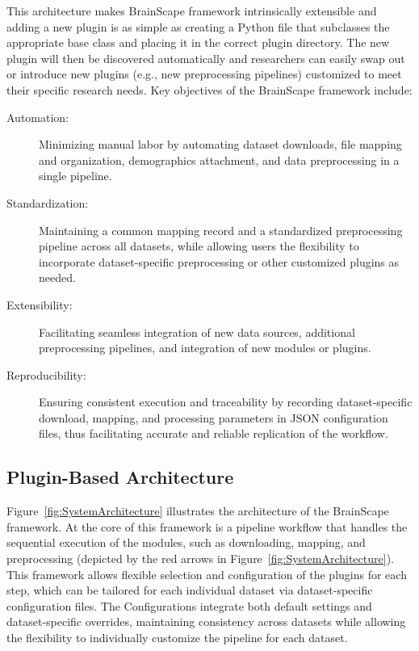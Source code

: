 This architecture makes BrainScape framework intrinsically extensible and adding a new plugin
is as simple as creating a Python file that subclasses the appropriate base class 
and placing it in the correct plugin directory. 
The new plugin will then be discovered automatically and 
researchers can easily swap out or introduce new plugins (e.g., new preprocessing pipelines) 
customized to meet their specific research needs.
Key objectives of the BrainScape framework include: 
\begin{description}
    \item[Automation:] Minimizing manual labor by automating dataset downloads, file mapping and organization, demographics attachment, and data preprocessing in a single pipeline.
    \item[Standardization:] Maintaining a common mapping record and a standardized preprocessing pipeline across all datasets, while allowing users the flexibility to incorporate dataset-specific preprocessing or other customized plugins as needed.
    \item[Extensibility:] Facilitating seamless integration of new data sources, additional preprocessing pipelines, and integration of new modules or plugins. 
    \item[Reproducibility:] Ensuring consistent execution and traceability by recording dataset-specific download, mapping, and processing parameters in JSON configuration files, thus facilitating accurate and reliable replication of the workflow.
\end{description}


\subsection{Plugin-Based Architecture}

Figure~\ref{fig:SystemArchitecture} illustrates the architecture of the BrainScape framework. 
At the core of this framework is a pipeline workflow that handles the sequential execution of the modules, 
such as downloading, mapping, and preprocessing (depicted by the red arrows in Figure~\ref{fig:SystemArchitecture}). 
This framework allows flexible selection and configuration of the plugins for each step, which can be tailored for 
each individual dataset via dataset-specific configuration files.
The Configurations integrate both default settings and dataset-specific overrides, maintaining consistency 
across datasets while allowing the flexibility to individually customize the pipeline for each dataset.

